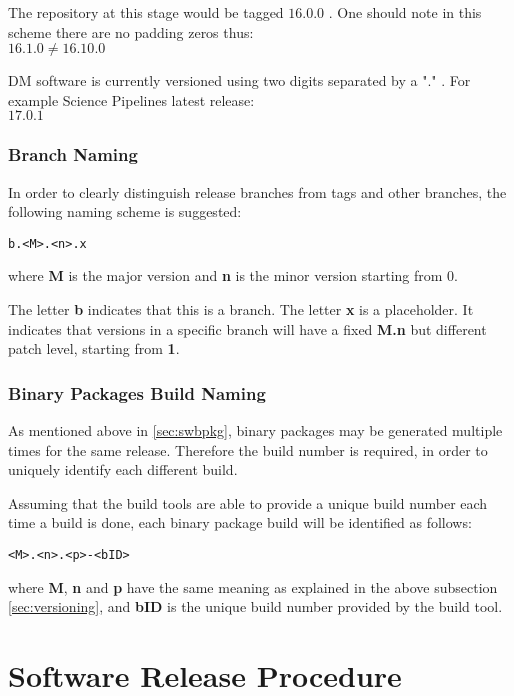 The repository at this stage would be tagged $16.0.0$ .
One should note in this scheme there are no padding zeros thus:
\\
$16.1.0   \neq 16.10.0$

DM software is currently versioned using two digits separated by a "." .
For example Science Pipelines latest release:\\
$17.0.1$


\subsubsection{Branch Naming} \label{sec:branchnaming}

In order to clearly distinguish release branches from tags and other branches, the following naming scheme is suggested:

\begin{verbatim}
b.<M>.<n>.x
\end{verbatim}

where \textbf{M} is the major version and \textbf{n} is the minor version starting from 0.

The letter  \textbf{b} indicates that this is a branch.
The letter \textbf{x} is a placeholder. It indicates that versions in a specific branch will have a fixed \textbf{M.n} but different patch level, starting from \textbf{1}.

\subsubsection{Binary Packages Build Naming} \label{sec:binpkgname}

As mentioned above in \ref{sec:swbpkg}, binary packages may be generated multiple times for the same release.
Therefore the build number is required, in order to uniquely identify each different build.

Assuming that the build tools are able to provide a unique build number each time a build is done, 
each binary package build will be identified as follows:

\begin{verbatim}
<M>.<n>.<p>-<bID>
\end{verbatim}

where \textbf{M}, \textbf{n} and \textbf{p} have the same meaning as explained in the above subsection \ref{sec:versioning},
and \textbf{bID} is the unique build number provided by the build tool.


\newpage
\section{Software Release Procedure} \label{sec:releaseprocedure}


